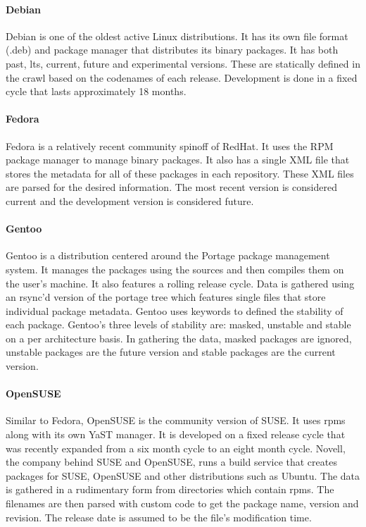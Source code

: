 \documentclass[letterpaper,10pt]{article}
\begin{document}
\paragraph{Debian}
Debian is one of the oldest active Linux distributions.  It has its own file format (.deb) and package manager that distributes its binary packages.  It has both past, lts, current, future and experimental versions.  These are statically defined in the crawl based on the codenames of each release.  Development is done in a fixed cycle that lasts approximately 18 months.
\paragraph{Fedora}
Fedora is a relatively recent community spinoff of RedHat.  It uses the RPM package manager to manage binary packages.  It also has a single XML file that stores the metadata for all of these packages in each repository.  These XML files are parsed for the desired information.  The most recent version is considered current and the development version is considered future.
\paragraph{Gentoo}
Gentoo is a distribution centered around the Portage package management system.  It manages the packages using the sources and then compiles them on the user's machine.  It also features a rolling release cycle.  Data is gathered using an rsync'd version of the portage tree which features single files that store individual package metadata.  Gentoo uses keywords to defined the stability of each package.  Gentoo's three levels of stability are: masked, unstable and stable on a per architecture basis.  In gathering the data, masked packages are ignored, unstable packages are the future version and stable packages are the current version.
\paragraph{OpenSUSE}
Similar to Fedora, OpenSUSE is the community version of SUSE.  It uses rpms along with its own YaST manager.  It is developed on a fixed release cycle that was recently expanded from a six month cycle to an eight month cycle.  Novell, the company behind SUSE and OpenSUSE, runs a build service that creates packages for SUSE, OpenSUSE and other distributions such as Ubuntu.  The data is gathered in a rudimentary form from directories which contain rpms.  The filenames are then parsed with custom code to get the package name, version and revision.  The release date is assumed to be the file's modification time. 
\end{document}
